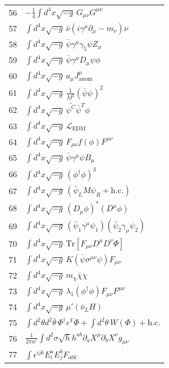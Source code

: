 \documentclass[11pt,a4paper]{article}
\begin{document}
\begin{longtable}{r p{}}
	56 & \(\displaystyle -\frac14\int d^4x\sqrt{-g}\,G_{\mu\nu}G^{\mu\nu}\) \\
	57 & \(\displaystyle \int d^4x\sqrt{-g}\,\bar\nu(i\gamma^\mu\partial_\mu - m_\nu)\nu\) \\
	58 & \(\displaystyle \int d^4x\sqrt{-g}\,\bar\psi\gamma^\mu\gamma_5\psi Z_\mu\) \\
	59 & \(\displaystyle \int d^4x\sqrt{-g}\,\bar\psi\gamma^\mu D_\mu\psi\phi\) \\
	60 & \(\displaystyle \int d^4x\sqrt{-g}\,a_\mu J^\mu_{\text{anom}}\) \\
	61 & \(\displaystyle \int d^4x\sqrt{-g}\,\frac{1}{M^2}(\bar\psi\psi)^2\) \\
	62 & \(\displaystyle \int d^4x\sqrt{-g}\,\bar{\psi^C}\bar{\psi}^T\phi\) \\
	63 & \(\displaystyle \int d^4x\sqrt{-g}\,\mathcal{L}_{\text{EDM}}\) \\
	64 & \(\displaystyle \int d^4x\sqrt{-g}\,F_{\mu\nu}f(\phi)F^{\mu\nu}\) \\
	65 & \(\displaystyle \int d^4x\sqrt{-g}\,\bar\psi\gamma^\mu\psi B_\mu\) \\
	66 & \(\displaystyle \int d^4x\sqrt{-g}\,(\phi^\dagger\phi)^3\) \\
	67 & \(\displaystyle \int d^4x\sqrt{-g}\,(\bar\psi_L M \psi_R + \text{h.c.})\) \\
	68 & \(\displaystyle \int d^4x\sqrt{-g}\,(D_\mu\phi)^*(D^\mu\phi)\) \\
	69 & \(\displaystyle \int d^4x\sqrt{-g}\,(\bar\psi_1\gamma^\mu\psi_1)(\bar\psi_2\gamma_\mu\psi_2)\) \\
	70 & \(\displaystyle \int d^4x\sqrt{-g}\,\mathrm{Tr}[F_{\mu\nu}D^\mu D^\nu\Phi]\) \\
	71 & \(\displaystyle \int d^4x\sqrt{-g}\,K(\bar\psi\sigma^{\mu\nu}\psi)F_{\mu\nu}\) \\
	72 & \(\displaystyle \int d^4x\sqrt{-g}\,m_\chi\bar\chi\chi\) \\
	73 & \(\displaystyle \int d^4x\sqrt{-g}\,\lambda_1(\phi^\dagger\phi)F_{\mu\nu}F^{\mu\nu}\) \\
	74 & \(\displaystyle \int d^4x\sqrt{-g}\,\mu'(\bar\nu_L H)\) \\
	75 & \(\displaystyle \int d^2\theta d^2\bar\theta\,\Phi^\dagger e^V\Phi + \int d^2\theta\,W(\Phi) + \text{h.c.}\) \\
	76 & \(\displaystyle \frac{1}{2\pi\alpha'}\int d^2\sigma\sqrt{h}h^{ab}\partial_a X^\mu\partial_b X^\nu g_{\mu\nu}\) \\
	77 & \(\displaystyle \int \epsilon^{ijk}E_i^a E_j^b F_{ab k}\) \\

\end{longtable}
\end{document}

